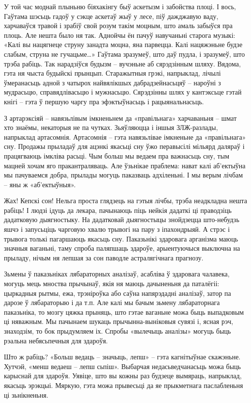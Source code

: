 У той час моднай плыньню біяхакінгу быў аскетызм і забойства плоці. І вось, Гаўтама шэсьць гадоў у сэкце аскетаў жыў у лесе, піў дажджавую ваду, харчаваўся травой і зрабіў свой розум такім моцным, што амаль забыўся пра плоць. Але нешта было ня так. Аднойчы ён пачуў навучаньні старога музыкі: «Калі вы нацягнеце струну занадта моцна, яна парвецца. Калі нацяжэньне будзе слабым, струна не гучацьме…» Гаўтама зразумеў, што даў пудла, і зразумеў, што трэба рабіць. Так нарадзіўся будызм – вучэньне аб сярэдзінным шляху. Вядома, гэта ня чыста будыйскі прынцып. Старажытныя грэкі, напрыклад, лічылі ўмеранасьць адной з чатырох найвялікшых дабрадзейнасьцяў – нароўні з мудрасьцю, справядлівасьцю і мужнасьцю. Сярэдзінны шлях у кантэксьце гэтай кнігі – гэта ў першую чаргу пра эфэктыўнасьць і рацыянальнасьць.

З артарэксіяй – навязьлівым імкненьнем да «правільнага» харчаваньня – шмат хто знаёмы, некаторыя не па чутках. Зьяўляюцца і іншыя ЗЛЖ-разлады, напрыклад артасомнія. Артасомнія – гэта навязьлівае імкненьне да «правільнага» сну. Продажы прыладаў для ацэнкі якасьці сну ўжо перавысілі мільярд даляраў і працягваюць імкліва расьці. Чым больш мы ведаем пра важнасьць сну, тым мацней хочам яго пракантраляваць. Але ўзьнікае праблема: нават калі аб'ектыўна мы пачуваемся добра, прылады могуць паказваць адхіленьні. І мы верым лічбам – яны ж «аб'ектыўныя».

Жах! Кепскі сон! Нельга проста глядзець на гэтыя лічбы, трэба неадкладна нешта рабіць! І людзі ідуць да лекара, пачынаюць піць нейкія дадаткі ці праводзіць дадатковую дыягностыку. На дадатковай дыягностыцы знойдзецца што-небудзь яшчэ і запусьціць чарговую хвалю трывогі на пару з іпахондрыяй. А стрэс і трывога толькі пагаршаюць якасьць сну. Паказьнікі здаровага арганізма маюць значныя ваганьні, таму спроба паляпшаць здароўе, арыентуючыся выключна на прыладу, нічым ня лепшая за сон паводле астралягічнага прагнозу.

Зьмены ў паказьніках лябараторных аналізаў, асабліва ў здаровага чалавека, могуць мець мноства прычынаў, якія ня маюць дачыненьня да паталёгіі: цыркадныя рытмы, ежа, трэніроўка або саўна напярэдадні аналізаў, затор па дарозе ў лябараторыю і да т.п. Але калі мы бачым зьмену лябараторнага паказьніка, то мозгу цяжка прыняць, што гэтае ваганьне можа быць выпадковым ці няважным. Мы пачынаем шукаць прычынна-выніковыя сувязі і, ясная рэч, знаходзім, то бок прыдумляем іх. Спробы «вылечыць аналізы» могуць быць рэальна небясьпечныя для здароўя.

Што ж рабіць? «Больш ведаць – значыць, лепш» – гэта кагнітыўнае скажэньне. Хутчэй, «менш ведаеш – лепш сьпіш». Выбарчая недасьведчанасьць можа быць карыснай для здароўя. Уявіце, што вы кожны раз будзеце вымяраць, напрыклад, якасьць эрэкцыі. Мяркую, гэта можа прывесьці да яе прыкметнага паслабленьня ці зьнікненьня.

